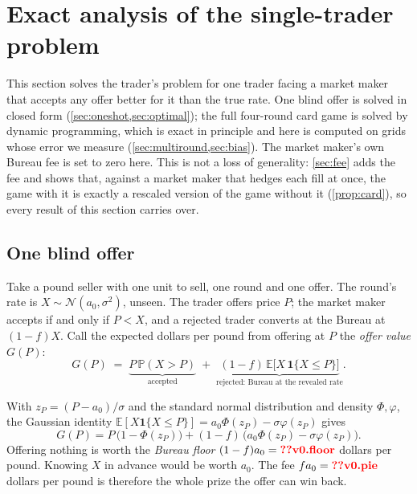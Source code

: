 \documentclass[11pt,a4paper]{article}
\makeatletter
\theoremstyle{plain}
\theoremstyle{definition}
\newcommand{\val}[1]{\ifcsname val@#1\endcsname\csname val@#1\endcsname\else
  \textcolor{red}{\textbf{??\detokenize{#1}}}\PackageWarning{paper}{Missing value #1}\fi}
\newcommand{\E}{\mathbb{E}}
\renewcommand{\Pr}{\mathbb{P}}
\newcommand{\1}{\mathbf{1}}
\newcommand{\N}{\mathcal{N}}
\makeatother
\begin{document}
\section{Exact analysis of the single-trader problem}\label{sec:exact}
This section solves the trader's problem for one trader facing a market maker that accepts any offer better for it than the true rate. One blind offer is solved in closed form (\cref{sec:oneshot,sec:optimal}); the full four-round card game is solved by dynamic programming, which is exact in principle and here is computed on grids whose error we measure (\cref{sec:multiround,sec:bias}). The market maker's own Bureau fee is set to zero here. This is not a loss of generality: \cref{sec:fee} adds the fee and shows that, against a market maker that hedges each fill at once, the game with it is exactly a rescaled version of the game without it (\cref{prop:card}), so every result of this section carries over.

\subsection{One blind offer}\label{sec:oneshot}
Take a pound seller with one unit to sell, one round and one offer. The round's rate is $X\sim\N(a_0,\sigma^2)$, unseen. The trader offers price $P$; the market maker accepts if and only if $P<X$, and a rejected trader converts at the Bureau at $(1-f)X$. Call the expected dollars per pound from offering at $P$ the \emph{offer value} $G(P)$:
\begin{equation}\label{eq:G}
  G(P) \;=\; \underbrace{P\,\Pr(X>P)}_{\text{accepted}} \;+\; \underbrace{(1-f)\,\E\big[X\,\1\{X\le P\}\big]}_{\text{rejected: Bureau at the revealed rate}}.
\end{equation}

With $z_P=(P-a_0)/\sigma$ and the standard normal distribution and density $\Phi,\varphi$, the Gaussian identity $\E[X\1\{X\le P\}]=a_0\Phi(z_P)-\sigma\varphi(z_P)$ gives
\begin{equation}\label{eq:Gclosed}
  G(P) = P\,\big(1-\Phi(z_P)\big) + (1-f)\,\big(a_0\Phi(z_P)-\sigma\varphi(z_P)\big).
\end{equation}
Offering nothing is worth the \emph{Bureau floor} $(1-f)a_0=\val{v0.floor}$ dollars per pound. Knowing $X$ in advance would be worth $a_0$. The fee $fa_0=\val{v0.pie}$ dollars per pound is therefore the whole prize the offer can win back.
\end{document}
